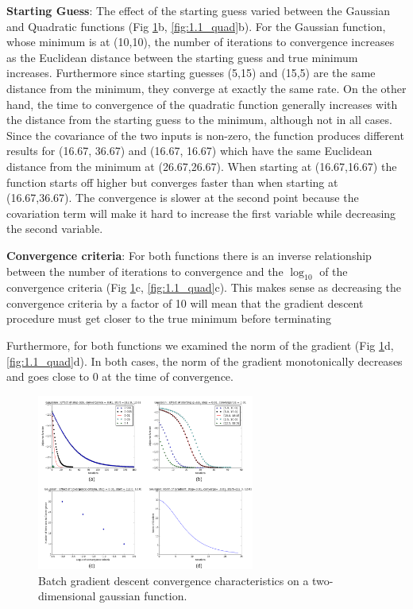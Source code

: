 \documentclass[10pt, twocolumn]{article}
\begin{document}
  \textbf{Starting Guess}: The effect of the starting guess varied between the Gaussian and Quadratic functions (Fig \ref{fig:1.1_gauss}b, \ref{fig:1.1_quad}b). For the Gaussian function, whose minimum is at (10,10), the number of iterations to convergence increases as the Euclidean distance between the starting guess and true minimum increases. Furthermore since starting guesses (5,15) and (15,5) are the same distance from the minimum, they converge at exactly the same rate. On the other hand, the time to convergence of the quadratic function generally increases with the distance from the starting guess to the minimum, although not in all cases. Since the covariance of the two inputs is non-zero, the function produces different results for (16.67, 36.67) and (16.67, 16.67) which have the same Euclidean distance from the minimum at (26.67,26.67). When starting at (16.67,16.67) the function starts off higher but converges faster than when starting at (16.67,36.67). The convergence is slower at the second point because the covariation term will make it hard to increase the first variable while decreasing the second variable. 
  
\textbf{Convergence criteria}: For both functions there is an inverse relationship between the number of iterations to convergence and the $\log_{10}$ of the convergence criteria (Fig \ref{fig:1.1_gauss}c, \ref{fig:1.1_quad}c). This makes sense as decreasing the convergence criteria by a factor of 10 will mean that the gradient descent procedure must get closer to the true minimum before terminating

Furthermore, for both functions we examined the norm of the gradient (Fig \ref{fig:1.1_gauss}d, \ref{fig:1.1_quad}d). In both cases, the norm of the gradient monotonically decreases and goes close to 0 at the time of convergence.

\begin{figure}
\caption{Batch gradient descent convergence characteristics on a two-dimensional gaussian function.}
\begin{center}
\includegraphics[width=270px]{all_gaussian_gd}
\end{center}
\label{fig:1.1_gauss}
\end{figure}
\end{document}
